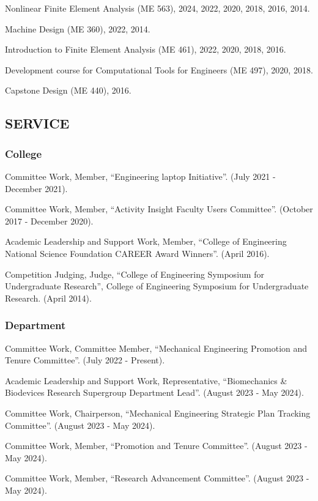 \documentclass[11pt]{article}
\begin{document}
Nonlinear Finite Element Analysis (ME 563), 2024, 2022, 2020, 2018, 2016, 2014.

Machine Design (ME 360), 2022, 2014.

Introduction to Finite Element Analysis (ME 461), 2022, 2020, 2018, 2016.

Development course for Computational Tools for Engineers (ME 497), 2020, 2018.

Capstone Design (ME 440), 2016.

\subsection{SERVICE}\label{service}

\subsubsection{College}\label{college}

Committee Work, Member, ``Engineering laptop Initiative''. 
(July
2021 - December 2021).

Committee Work, Member, ``Activity Insight Faculty Users
Committee''. 
(October 2017 - December 2020).

Academic Leadership and Support Work, Member, ``College of
Engineering National Science Foundation CAREER Award Winners''. 
(April
2016).

Competition Judging, Judge, ``College of Engineering Symposium
for Undergraduate Research'', College of Engineering Symposium for
Undergraduate Research. 
(April 2014).

\subsubsection{Department}\label{department}

Committee Work, Committee Member, ``Mechanical Engineering
Promotion and Tenure Committee''. 
(July 2022 - Present).

Academic Leadership and Support Work, Representative,
``Biomechanics \& Biodevices Research Supergroup Department Lead''.
(August 2023 - May 2024).

Committee Work, Chairperson, ``Mechanical Engineering
Strategic Plan Tracking Committee''. 
(August 2023 - May 2024).

Committee Work, Member, ``Promotion and Tenure Committee''.
(August 2023 - May 2024).

Committee Work, Member, ``Research Advancement Committee''.
(August 2023 - May 2024).
\end{document}
